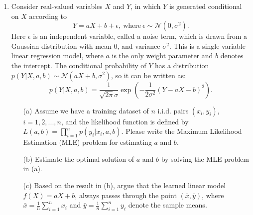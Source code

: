 \documentclass[10pt]{article}
\begin{document}
\begin{enumerate}[1.]
	      \newpage

	\item {} Consider real-valued variables $X$ and $Y$, in which $Y$ is generated conditional on $X$ according to
	      $$
		      Y = aX + b + \epsilon, \ \text{where} \ \epsilon \sim \mathcal{N}(0, \sigma^2).
	      $$
	      Here $\epsilon$ is an independent variable, called a noise term, which is drawn from a Gaussian distribution with mean 0,
	      and variance $\sigma^2$. This is a single variable linear regression model, where $a$ is the only weight parameter and $b$ denotes the intercept.
	      The conditional probability of $Y$ has a distribution $p(Y | X, a, b) \sim \mathcal{N}(aX+b, \sigma^2)$, so it can be written as:
	      $$
		      p(Y|X, a,b) = \frac{1}{\sqrt{2\pi}\sigma}\exp\left(-\frac{1}{2\sigma^2}(Y - aX -b)^2\right).
	      $$
	      \begin{itemize}
		      \item[(a)] Assume we have a training dataset of $n$ i.i.d. pairs $(x_i, y_i)$, $i = 1, 2, ..., n$, and
		            the likelihood function is defined by $L(a,b) = \prod_{i=1}^n p(y_i | x_i, a, b)$. Please write the
		            Maximum Likelihood Estimation (MLE) problem for estimating $a$ and $b$.~
		      \item[(b)] Estimate the optimal solution of $a$ and $b$ by solving the MLE problem in (a).~
		      \item[(c)] Based on the result in (b), argue that the learned linear model $f(X) = aX + b$,
		            always passes through the point $(\bar{x},\bar{y})$,
		            where $\bar{x} = \tfrac{1}{n}\sum_{i=1}^{n}x_{i}$ and $\bar{y} = \tfrac{1}{n}\sum_{i=1}^{n}y_{i}$ denote the sample means.~
	      \end{itemize}





	      \newpage


\end{enumerate}
\end{document}
